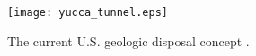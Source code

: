 \begin{figure}[htbp!]
  \begin{center}
    \texttt{[image: yucca\_tunnel.eps]}
  \end{center}
  \caption{The current U.S. geologic disposal concept \cite{peters_whats_2013}.}
  \label{fig:yucca_tunnel}
\end{figure}
